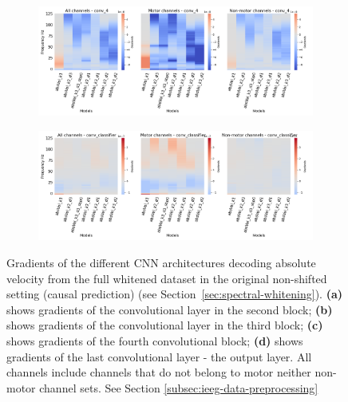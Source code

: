 \begin{figure}[!htbp]\ContinuedFloat

\begin{subfigure}[b]{\textwidth}
   \includegraphics[width=1\linewidth]{img/appendix/D/conv-4/m/absVel_model_gradients_all_kinds}
   \caption{}
   \label{fig:absVel-pw-full-grads-conv-4}
\end{subfigure}

\begin{subfigure}[b]{\textwidth}
   \includegraphics[width=1\linewidth]{img/appendix/D/conv-classifier/m/absVel_model_gradients_all_kinds}
   \caption{}
   \label{fig:absVel-pw-full-grads-conv-classifier}
\end{subfigure}

\caption[]{Gradients of the different CNN architectures decoding absolute velocity from the full whitened dataset in the original non-shifted setting (causal prediction) (see Section~\ref{sec:spectral-whitening}). \textbf{(a)} shows gradients of the convolutional layer in the second block; \textbf{(b)} shows gradients of the convolutional layer in the third block; \textbf{(c)} shows gradients of the fourth convolutional block; \textbf{(d)} shows gradients of the last convolutional layer - the output layer. All channels include channels that do not belong to motor neither non-motor channel sets. See Section \ref{subsec:ieeg-data-preprocessing}}
\label{fig:absVel-pw-full-grads}
\end{figure}

